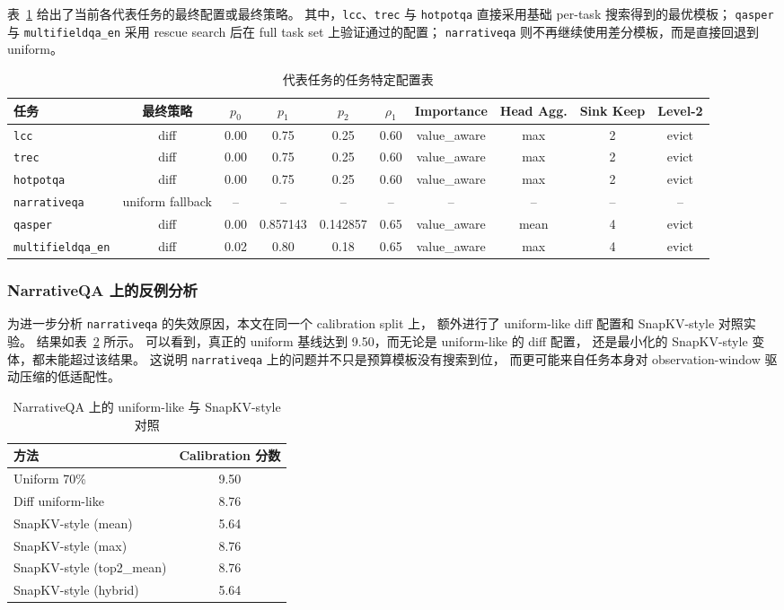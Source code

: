 表~\ref{tab:diffsparsekv-task-configs} 给出了当前各代表任务的最终配置或最终策略。
其中，\texttt{lcc}、\texttt{trec} 与 \texttt{hotpotqa}
直接采用基础 per-task 搜索得到的最优模板；
\texttt{qasper} 与 \texttt{multifieldqa\_en}
采用 rescue search 后在 full task set 上验证通过的配置；
\texttt{narrativeqa} 则不再继续使用差分模板，而是直接回退到 uniform。

\begin{table}[t]
\centering
\caption{代表任务的任务特定配置表}
\label{tab:diffsparsekv-task-configs}
\small
\setlength{\tabcolsep}{4pt}
\begin{tabular}{lccccccccc}
\toprule
任务 & 最终策略 & $p_0$ & $p_1$ & $p_2$ & $\rho_1$ & Importance & Head Agg. & Sink Keep & Level-2 \\
\midrule
\texttt{lcc} & diff & 0.00 & 0.75 & 0.25 & 0.60 & value\_aware & max & 2 & evict \\
\texttt{trec} & diff & 0.00 & 0.75 & 0.25 & 0.60 & value\_aware & max & 2 & evict \\
\texttt{hotpotqa} & diff & 0.00 & 0.75 & 0.25 & 0.60 & value\_aware & max & 2 & evict \\
\texttt{narrativeqa} & uniform fallback & -- & -- & -- & -- & -- & -- & -- & -- \\
\texttt{qasper} & diff & 0.00 & 0.857143 & 0.142857 & 0.65 & value\_aware & mean & 4 & evict \\
\texttt{multifieldqa\_en} & diff & 0.02 & 0.80 & 0.18 & 0.65 & value\_aware & max & 4 & evict \\
\bottomrule
\end{tabular}
\end{table}

\subsubsection{NarrativeQA 上的反例分析}

为进一步分析 \texttt{narrativeqa} 的失效原因，本文在同一个 calibration split 上，
额外进行了 uniform-like diff 配置和 SnapKV-style 对照实验。
结果如表~\ref{tab:diffsparsekv-narrative-snapkv} 所示。
可以看到，真正的 uniform 基线达到 9.50，而无论是 uniform-like 的 diff 配置，
还是最小化的 SnapKV-style 变体，都未能超过该结果。
这说明 \texttt{narrativeqa} 上的问题并不只是预算模板没有搜索到位，
而更可能来自任务本身对 observation-window 驱动压缩的低适配性。

\begin{table}[t]
\centering
\caption{NarrativeQA 上的 uniform-like 与 SnapKV-style 对照}
\label{tab:diffsparsekv-narrative-snapkv}
\small
\begin{tabular}{lc}
\toprule
方法 & Calibration 分数 \\
\midrule
Uniform 70\% & 9.50 \\
Diff uniform-like & 8.76 \\
SnapKV-style (mean) & 5.64 \\
SnapKV-style (max) & 8.76 \\
SnapKV-style (top2\_mean) & 8.76 \\
SnapKV-style (hybrid) & 5.64 \\
\bottomrule
\end{tabular}
\end{table}

